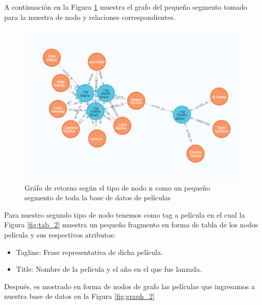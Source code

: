 A continuación en la Figura \ref{fig:graph_1} muestra el grafo del pequeño segmento tomado para la muestra de nodo y relaciones correspondientes.
\begin{figure}[H]
    \centering
    \includegraphics[scale=0.6]{Graficos/graph1.png}
    \caption{Gráfo de retorno según el tipo de nodo n como un pequeño segmento de toda la base de datos de películas}
    \label{fig:graph_1}
\end{figure}
Para nuestro segundo tipo de nodo tenemos como tag a película en el cual la Figura \ref{fig:tab_2} muestra un pequeño fragmento en forma de tabla de los nodos película y sus respectivos atributos:
\begin{itemize}
    \item Tagline: Frase representativa de dicha película.
    \item Title: Nombre de la película y el año en el que fue lanzada.
\end{itemize}
Después, es mostrado en forma de nodos de grafo las películas que ingresamos a nuestra base de datos en la Figura \ref{fig:graph_2}
